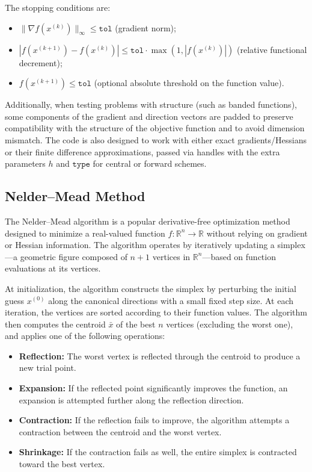\documentclass[a4paper,12pt]{article}
\begin{document}
	The stopping conditions are:
	\begin{itemize}[nosep]
		\item \( \|\nabla f(x^{(k)})\|_\infty \leq \texttt{tol} \) (gradient norm);
		\item \( |f(x^{(k+1)}) - f(x^{(k)})| \leq \texttt{tol} \cdot \max(1, |f(x^{(k)})|) \) (relative functional decrement);
		\item \( f(x^{(k+1)}) \leq \texttt{tol} \) (optional absolute threshold on the function value).
	\end{itemize}
	
	Additionally, when testing problems with structure (such as banded functions), some components of the gradient and direction vectors are padded to preserve compatibility with the structure of the objective function and to avoid dimension mismatch. The code is also designed to work with either exact gradients/Hessians or their finite difference approximations, passed via handles with the extra parameters \( h \) and \( \texttt{type} \) for central or forward schemes.
	
	
	\newpage
	\subsection{Nelder--Mead Method}
	
	The Nelder--Mead algorithm is a popular derivative-free optimization method designed to minimize a real-valued function \( f: \mathbb{R}^n \to \mathbb{R} \) without relying on gradient or Hessian information. The algorithm operates by iteratively updating a simplex—a geometric figure composed of \( n+1 \) vertices in \( \mathbb{R}^n \)—based on function evaluations at its vertices.
	
	At initialization, the algorithm constructs the simplex by perturbing the initial guess \( x^{(0)} \) along the canonical directions with a small fixed step size. At each iteration, the vertices are sorted according to their function values. The algorithm then computes the centroid \( \bar{x} \) of the best \( n \) vertices (excluding the worst one), and applies one of the following operations:
	
	\begin{itemize}[nosep]
		\item \textbf{Reflection:} The worst vertex is reflected through the centroid to produce a new trial point.
		\item \textbf{Expansion:} If the reflected point significantly improves the function, an expansion is attempted further along the reflection direction.
		\item \textbf{Contraction:} If the reflection fails to improve, the algorithm attempts a contraction between the centroid and the worst vertex.
		\item \textbf{Shrinkage:} If the contraction fails as well, the entire simplex is contracted toward the best vertex.
	\end{itemize}
	
\end{document}

